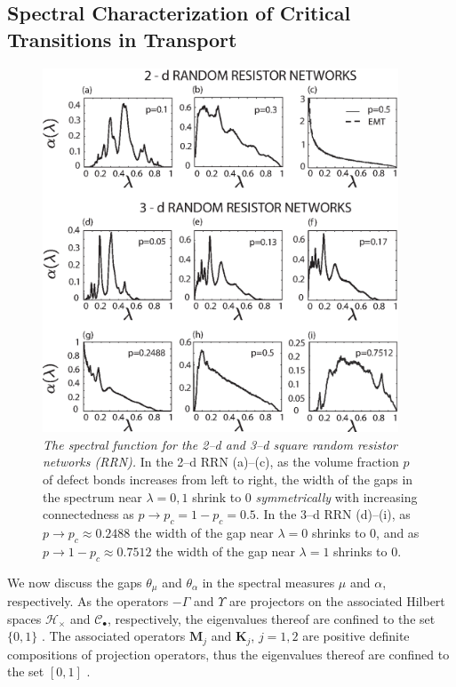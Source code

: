 \documentclass[english,12pt,jmp,graphicx]{revtex4-1}
\begin{document}
\subsection{Spectral Characterization of Critical Transitions in
  Transport} \label{sec:Spectral_Gap}  
%
%
\begin{figure}\label{fig:2D-RBN}
\includegraphics[width=25pc]{2-3-d_Random_Resistor_Networks.eps}%
\caption{\emph{The spectral function for the 2--d and 3--d square
    random resistor networks (RRN).} In the 2--d RRN (a)--(c), as the
  volume fraction $p$ of defect bonds increases from left to right,
  the width of the gaps in the spectrum near $\lambda=0,1$ shrink to 0
  \emph{symmetrically} with increasing connectedness as $p\to p_c=1-p_c=0.5.$ In
  the 3--d RRN (d)--(i), as $p\to p_c\approx0.2488$ the width of the gap near
  $\lambda=0$ shrinks to 0, and as $p\to1-p_c\approx0.7512$ the width of the gap
  near $\lambda=1$ shrinks to 0.} 
\end{figure}
%

We now discuss the gaps $\theta_\mu$ and $\theta_\alpha$ in the spectral measures $\mu$
and $\alpha$, respectively. As
the operators $-\Gamma$ and $\Upsilon$ are projectors on the associated Hilbert
spaces $\mathscr{H}_\times$ and $\mathscr{C}_\bullet$, 
respectively, the eigenvalues thereof are confined to the set $\{0,1\}$
\cite{Reed-1980}. The associated operators $\mathbf{M}_j$ and $\mathbf{K}_j$,
$j=1,2$ are positive definite compositions of projection operators,
thus the eigenvalues thereof are confined to the set $[0,1]$
\cite{Golden:CMP-467}.
\end{document}
